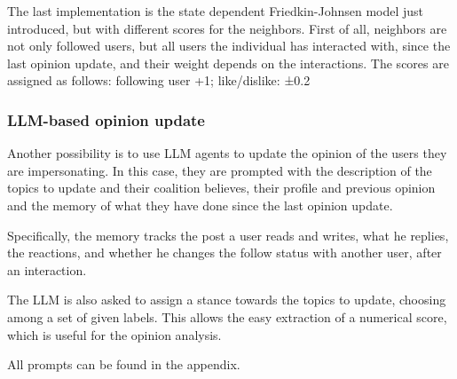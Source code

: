 The last implementation is the state dependent Friedkin-Johnsen model just introduced, but with different scores for the neighbors. 
First of all, neighbors are not only followed users, but all users the individual has interacted with, since the last opinion update, and their weight depends on the interactions. 
The scores are assigned as follows: following user +1; like/dislike: ±0.2



\subsubsection{LLM-based opinion update}
Another possibility is to use LLM agents to update the opinion of the users they are impersonating.
In this case, they are prompted with the description of the topics to update and their coalition believes, their profile and previous opinion and the memory of what they have done since the last opinion update.

Specifically, the memory tracks the post a user reads and writes, what he replies, the reactions, and whether he changes the follow status with another user, after an interaction. 

The LLM is also asked to assign a stance towards the topics to update, choosing among a set of given labels. This allows the easy extraction of a numerical score, which is useful for the opinion analysis.

All prompts can be found in the appendix.